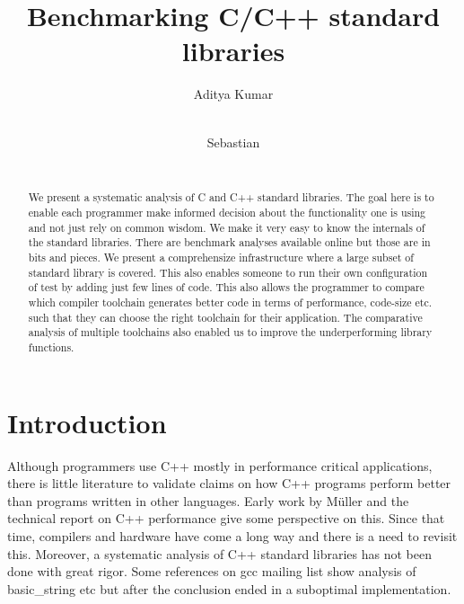 \documentclass{sig-alternate}
\begin{document}
\def \GCC {GCC}
\def \LLVM {LLVM}

\setlength{\pdfpageheight}{\paperheight}
\setlength{\pdfpagewidth}{\paperwidth}

\title{Benchmarking C/C++ standard libraries}


\author{
\alignauthor
Aditya Kumar\\
       \\
\and
\alignauthor
Sebastian\\
       \\
}

\maketitle
\begin{abstract}
We present a systematic analysis of C and C++ standard libraries. The goal here
is to enable each programmer make informed decision about the functionality one
is using and not just rely on common wisdom. We make it very easy to know the
internals of the standard libraries. There are benchmark analyses available
online but those are in bits and pieces. We present a comprehensize
infrastructure where a large subset of standard library is covered. This also
enables someone to run their own configuration of test by adding just few lines
of code. This also allows the programmer to compare which compiler toolchain
generates better code in terms of performance, code-size etc. such that they can
choose the right toolchain for their application. The comparative analysis of
multiple toolchains also enabled us to improve the underperforming library
functions.
\end{abstract}

\section{Introduction}
Although programmers use C++ mostly in performance critical applications,
there is little literature to validate claims on how C++ programs perform
better than programs written in other languages. Early work by M{\"u}ller \cite{muller}
and the technical report on C++ performance \cite{c++perftr} give some
perspective on this. Since that time, compilers and hardware have come a long way
and there is a need to revisit this. Moreover, a systematic analysis of C++ standard libraries
has not been done with great rigor. Some references on gcc mailing list show
analysis of basic\_string etc but after the conclusion ended in a suboptimal
implementation.
\end{document}
